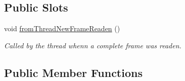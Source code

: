 \subsection*{Public Slots}
\begin{DoxyCompactItemize}
\item 
void \hyperlink{classmdt_modbus_tcp_port_manager_ad941ea607f00db54aa6deb2866a539e9}{fromThreadNewFrameReaden} ()
\begin{DoxyCompactList}\small\item\em Called by the thread whenn a complete frame was readen. \end{DoxyCompactList}\end{DoxyCompactItemize}
\subsection*{Public Member Functions}
